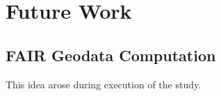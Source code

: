 















\section{Future Work}
\label{chap:future-work}

\subsection{FAIR Geodata Computation}
This idea arose during execution of the study. 



